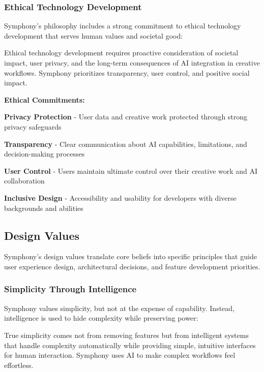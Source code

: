 \subsubsection{Ethical Technology Development}

Symphony's philosophy includes a strong commitment to ethical technology development that serves human values and societal good:

\begin{alertbox}
Ethical technology development requires proactive consideration of societal impact, user privacy, and the long-term consequences of AI integration in creative workflows. Symphony prioritizes transparency, user control, and positive social impact.
\end{alertbox}

\textbf{Ethical Commitments:}

\begin{compactlist}
    \item \textbf{Privacy Protection} - User data and creative work protected through strong privacy safeguards
    \item \textbf{Transparency} - Clear communication about AI capabilities, limitations, and decision-making processes
    \item \textbf{User Control} - Users maintain ultimate control over their creative work and AI collaboration
    \item \textbf{Inclusive Design} - Accessibility and usability for developers with diverse backgrounds and abilities
\end{compactlist}

\subsection{Design Values}
\label{subsec:design-values}

Symphony's design values translate core beliefs into specific principles that guide user experience design, architectural decisions, and feature development priorities.

\subsubsection{Simplicity Through Intelligence}

Symphony values simplicity, but not at the expense of capability. Instead, intelligence is used to hide complexity while preserving power:

\begin{infobox}[title=Intelligent Simplicity]
True simplicity comes not from removing features but from intelligent systems that handle complexity automatically while providing simple, intuitive interfaces for human interaction. Symphony uses AI to make complex workflows feel effortless.
\end{infobox}

